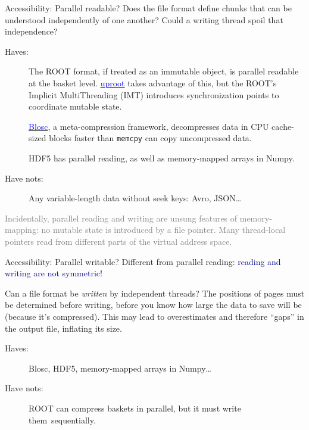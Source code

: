 \documentclass[aspectratio=169]{beamer}
\begin{document}
\begin{frame}{Accessibility: Parallel readable?}
\vspace{0.5 cm}
Does the file format define chunks that can be understood independently of one another? Could a writing thread spoil that independence?

\vfill

\begin{description}
\item[Haves:] The ROOT format, if treated as an immutable object, is parallel readable at the basket level. \href{https://github.com/scikit-hep/uproot}{\textcolor{blue}{uproot}} takes advantage of this, but the ROOT's Implicit MultiThreading (IMT) introduces synchronization points to coordinate mutable state.

\vspace{0.1 cm}
\href{http://blosc.org/pages/blosc-in-depth/}{\textcolor{blue}{Blosc}}, a meta-compression framework, decompresses data in CPU cache-sized blocks faster than {\tt\small memcpy} can copy uncompressed data.

\vspace{0.1 cm}
HDF5 has parallel reading, as well as memory-mapped arrays in Numpy.

\item[Have nots:] Any variable-length data without seek keys: Avro, JSON\ldots
\end{description}

\vfill

\textcolor{gray}{Incidentally, parallel reading and writing are unsung features of memory-mapping: no mutable state is introduced by a file pointer. Many thread-local pointers read from different parts of the virtual address space.}
\end{frame}

\begin{frame}{Accessibility: Parallel writable?}
\vspace{0.5 cm}
Different from parallel reading: \textcolor{darkblue}{reading and writing are not symmetric!}

\vspace{0.5 cm}
Can a file format be {\it written} by independent threads? The positions of pages must be determined before writing, before you know how large the data to save will be (because it's compressed). This may lead to overestimates and therefore ``gaps'' in the output file, inflating its size.

\vspace{0.5 cm}

\begin{description}
\item[Haves:] Blosc, HDF5, memory-mapped arrays in Numpy\ldots
\item[Have nots:] ROOT can compress baskets in parallel, but it must write \mbox{them sequentially.\hspace{-1 cm}}
\end{description}
\end{frame}
\end{document}
